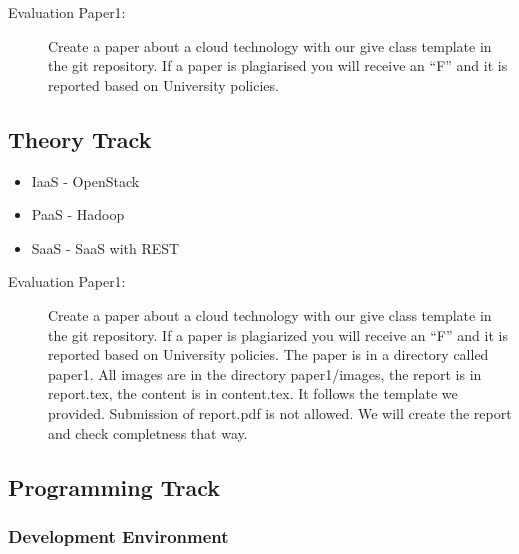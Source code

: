 


\begin{description}
\item[Evaluation Paper1:] Create a paper about a cloud technology with
  our give class template in the git repository. If a paper is
  plagiarised you will receive an ``F'' and it is reported based on
  University policies.
\end{description}

\subsection{Theory Track}

\begin{itemize}
\item IaaS - OpenStack
\item PaaS - Hadoop
\item SaaS - SaaS with REST
\end{itemize}

\begin{description}
\item[Evaluation Paper1:] Create a paper about a cloud technology with
  our give class template in the git repository. If a paper is
  plagiarized you will receive an ``F'' and it is reported based on
  University policies. The paper is in a directory called paper1. All
  images are in the directory paper1/images, the report is in
  report.tex, the content is in content.tex. It follows the template
  we provided. Submission of report.pdf is not allowed. We will create
  the report and check completness that way.
\end{description}

\subsection{Programming Track}

\subsubsection{Development Environment}


